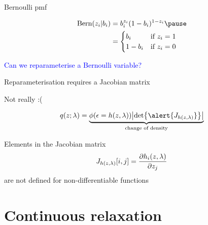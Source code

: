 \begin{frame}{Bernoulli pmf}

\begin{equation}
\begin{aligned}
\Bern(z_i|b_i) &= b_i^{z_i} (1 - b_i)^{1 - z_i} \pause \\
&= 
\begin{cases}
b_i & \text{if } z_i = 1 \\
1-b_i & \text{if } z_i = 0
\end{cases}
\end{aligned}
\end{equation}

\pause

\textcolor{blue}{Can we reparameterise a Bernoulli variable?}



\end{frame}

\begin{frame}{Reparameterisation requires a Jacobian matrix}


\alert{Not really :(} 

\begin{equation}
\begin{aligned}
q(z; \lambda) = \underbrace{\phi(\epsilon = h(z, \lambda)) \abs{\det \alert{J_{h(z, \lambda)}}}}_{\text{change of density}}
\end{aligned}
\end{equation}


Elements in the Jacobian matrix 
$$J_{h(z, \lambda)}[i,j] = \pdv{h_i(z, \lambda)}{z_j}$$
are not defined for non-differentiable functions


\end{frame}

\section{Continuous relaxation}

